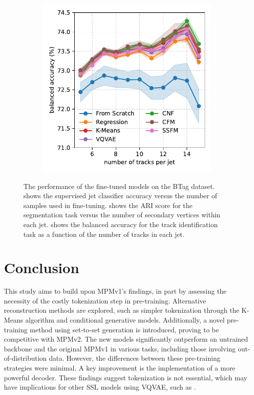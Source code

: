 \begin{figure}[h!]
\begin{subfigure}[b]{0.32\textwidth}
        \caption{}
        \label{fig:vtx}
    \end{subfigure}
    \begin{subfigure}[b]{0.32\textwidth}
        \centering
        \includegraphics[width=\linewidth]{Figures/foundation_models/mpm2/final/trk_finetune.pdf}
        \caption{}
        \label{fig:trk}
    \end{subfigure}
    \caption{The performance of the fine-tuned models on the BTag dataset.  shows the supervised jet classifier accuracy versus the number of samples used in fine-tuning.
         shows the ARI score for the segmentation task versus the number of secondary vertices within each jet.  shows the balanced accuracy for the track identification task as a function of the number of tracks in each jet.}
    \label{fig:plot_B}
\end{figure}

\section{Conclusion}
\label{sec:conclusion}

This study aims to build upon MPMv1's findings, in part by assessing the necessity of the costly tokenization step in pre-training.
Alternative reconstruction methods are explored, such as simpler tokenization through the K-Means algorithm and conditional generative models.
Additionally, a novel pre-training method using set-to-set generation is introduced, proving to be competitive with MPMv2.
The new models significantly outperform an untrained backbone and the original MPMv1 in various tasks, including those involving out-of-distribution data.
However, the differences between these pre-training strategies were minimal.
A key improvement is the implementation of a more powerful decoder.
These findings suggest tokenization is not essential, which may have implications for other SSL models using VQVAE, such as \textcite{Omnijet}.

